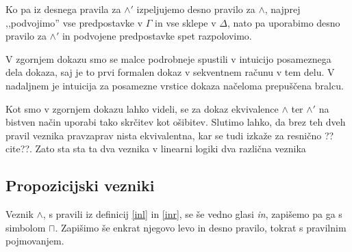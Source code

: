 \begin{dokaz}
    Ko pa iz desnega pravila za $\land'$ izpeljujemo desno pravilo za $\land$, najprej ,,podvojimo'' vse predpostavke v $\Gamma$ in vse sklepe v $\Delta$, nato pa uporabimo desno pravilo za $\land'$ in podvojene predpostavke spet razpolovimo.
    \begin{prooftree}
    \end{prooftree}
\end{dokaz}
\begin{opomba}
	V zgornjem dokazu smo se malce podrobneje spustili v intuicijo posameznega dela dokaza, saj je to prvi formalen dokaz v sekventnem računu v tem delu. V nadaljnem je intuicija za posamezne vrstice dokaza načeloma prepuščena bralcu.
\end{opomba}

Kot smo v zgornjem dokazu lahko videli, se za dokaz ekvivalence $\land$ ter $\land'$ na bistven način uporabi tako skrčitev kot ošibitev. Slutimo lahko, da brez teh dveh pravil veznika pravzaprav nista ekvivalentna, kar se tudi izkaže za resnično ??cite??. Zato sta sta ta dva veznika v linearni logiki dva različna veznika

\subsection{Propozicijski vezniki}

\begin{definicija} \label{in}
    Veznik $\land$, s pravili iz definicij \ref{inl} in \ref{inr}, se še vedno glasi \emph{in}, zapišemo pa ga s simbolom $\sqcap$. Zapišimo še enkrat njegovo levo in desno pravilo, tokrat s pravilnim pojmovanjem.
    \begin{center}
        \begin{bprooftree}
        \end{bprooftree}
        \begin{bprooftree}
        \end{bprooftree}
        \begin{bprooftree}
        \end{bprooftree}
    \end{center}
\end{definicija}


